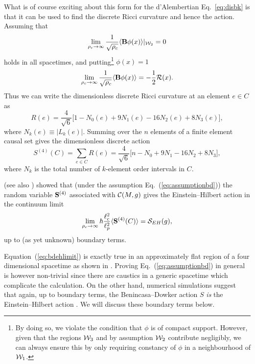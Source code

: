 What is of course exciting about this form for the d'Alembertian Eq.~\ref{eq:disbk} is that it can be used to find the discrete Ricci
curvature and hence the action. Assuming that 
\begin{equation} 
\lim_{\rho_c \rightarrow \infty} \frac{1}{\sqrt{\rho_c }}\langle {\mathbf B\phi(x)} \rangle|_{\mathcal W_2}  = 0 
\label{eq:assumptionbd} 
\end{equation} 
holds in all spacetimes, and  putting\footnote{By doing so, we violate the condition that $\phi$ is of
  compact support. However, given that the regions $\mathcal W_3$ and by assumption $\mathcal W_2$  contribute  negligibly, we can
  always ensure this by only requiring constancy of $\phi$ in a neighbourhood of   $\mathcal W_1$.}   $\phi(x)=1$    
\begin{equation} 
\lim_{\rho_c \rightarrow \infty} \frac{1}{\sqrt{\rho_c }}\langle {\mathbf B\phi(x)} \rangle = -\frac{1}{2} \mathcal R(x).
\end{equation} 
Thus we can write the dimensionless discrete Ricci curvature at an element $e \in  C$ \citep{dionthesis} as   
\begin{equation} 
R(e) =  \frac{4}{\sqrt{6}}\biggl[ 1 - N_0(e) + 9N_1(e) -16 N_2(e) +8N_3(e)\biggr], 
\end{equation}  
where $N_k(e)\equiv|L_k(e)|$.  Summing over the $n$ elements of a finite element causal set gives the dimensionless discrete action  
\begin{equation} 
\label{BD} 
S^{(4)} (C)= \sum_{e\in C} R(e)=\frac{4}{\sqrt{6}} \biggl[ n-  N_0 + 9N_1-16N_2+8N_3\biggl],      
\end{equation}  
where $N_k$ is the total number of $k$-element order intervals in $C$.  

\cite{bd} (see also \citealt{dionthesis}) showed  that (under the assumption Eq.~(\ref{eq:assumptionbd})) the random
variable $\mathbf{S}^{(4)}$ associated with $\mathcal C(M,g)$  gives the Einstein--Hilbert action in the continuum limit  
\begin{equation} 
\lim_{\rho_c \rightarrow \infty} \hbar \frac{\ell_c^2}{\ell_p^2} \langle {\mathbf{S}^{(4)}(C)} \rangle = \mathcal S_{EH}(g),   
\label{eq:bdehlimit} 
\end{equation} 
up to (as yet unknown)  boundary  terms.  

Equation~(\ref{eq:bdehlimit})  is exactly true in an approximately flat  region of a four dimensional spacetime  as
shown in  \cite{bbd}.  Proving Eq.~(\ref{eq:assumptionbd})  in general is however non-trivial since there are caustics
in a generic spacetime which complicate the calculation. On the other hand, numerical
simulations suggest that again, up to boundary terms,  the Benincasa--Dowker action $S$ \emph{is} the Einstein--Hilbert
action \citep{dionthesis,willthesis}. We will discuss these boundary terms below. 

